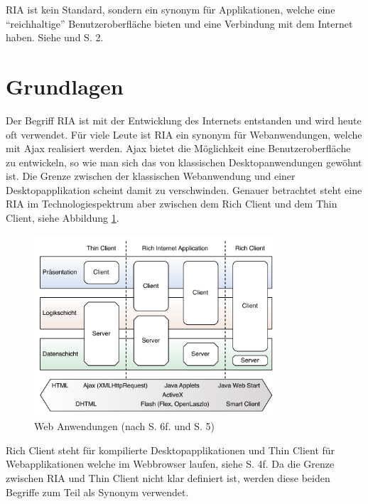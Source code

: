   \ac{RIA} ist kein Standard, sondern ein synonym für Applikationen, welche
  eine ``reichhaltige'' Benutzeroberfläche bieten und eine Verbindung mit dem
  Internet haben. Siehe \cite{RichInternetApplication} und
  \cite{RichInternetApplicationsWhitePaper} S. 2.
  
  \section{Grundlagen}
  
  Der Begriff \ac{RIA} ist mit der Entwicklung des Internets entstanden und
  wird heute oft verwendet. Für viele Leute ist \ac{RIA} ein synonym für
  Webanwendungen, welche mit \ac{Ajax} realisiert werden. \ac{Ajax} bietet die
  Möglichkeit eine Benutzeroberfläche zu entwickeln, so wie man sich das von
  klassischen Desktopanwendungen gewöhnt ist. Die Grenze zwischen der
  klassischen Webanwendung und einer Desktopapplikation scheint damit zu
  verschwinden. Genauer betrachtet steht eine \ac{RIA} im Technologiespektrum
  aber zwischen dem Rich Client und dem Thin Client, siehe Abbildung
  \ref{img:webanwendungen}.
  
  \begin{figure}[h]
    \begin{center}
      \includegraphics[width=0.81\textwidth]{./image/webanwendungen.pdf}
      \caption{Web Anwendungen (nach \cite{DiplomarbeitStephanSchuster} S. 6f.
      und \cite{WebApplicationSolutions} S. 5)}
      \label{img:webanwendungen}
    \end{center}
  \end{figure}
  
  Rich Client steht für kompilierte Desktopapplikationen und Thin Client für
  Webapplikationen welche im Webbrowser laufen, siehe
  \cite{WebApplicationSolutions} S. 4f. Da die Grenze zwischen \ac{RIA} und
  Thin Client nicht klar definiert ist, werden diese beiden Begriffe zum Teil
  als Synonym verwendet.
  
